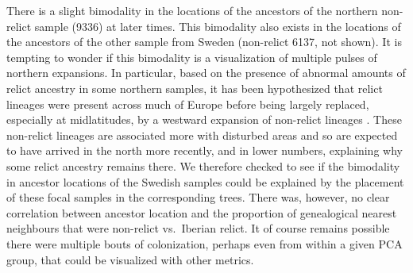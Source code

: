\documentclass[12pt]{article}
\begin{document}
There is a slight bimodality in the locations of the ancestors of the northern non-relict sample (9336) at later times. This bimodality also exists in the locations of the ancestors of the other sample from Sweden (non-relict 6137, not shown). It is tempting to wonder if this bimodality is a visualization of multiple pulses of northern expansions. In particular, based on the presence of abnormal amounts of relict ancestry in some northern samples, it has been hypothesized that relict lineages were present across much of Europe before being largely replaced, especially at midlatitudes, by a westward expansion of non-relict lineages \citep{lee2017post,hsu2019postglacial}. These non-relict lineages are associated more with disturbed areas and so are expected to have arrived in the north more recently, and in lower numbers, explaining why some relict ancestry remains there. We therefore checked to see if the bimodality in ancestor locations of the Swedish samples could be explained by the placement of these focal samples in the corresponding trees. There was, however, no clear correlation between ancestor location and the proportion of genealogical nearest neighbours that were non-relict vs.\ Iberian relict. It of course remains possible there were multiple bouts of colonization, perhaps even from within a given PCA group, that could be visualized with other metrics.

\end{document}
